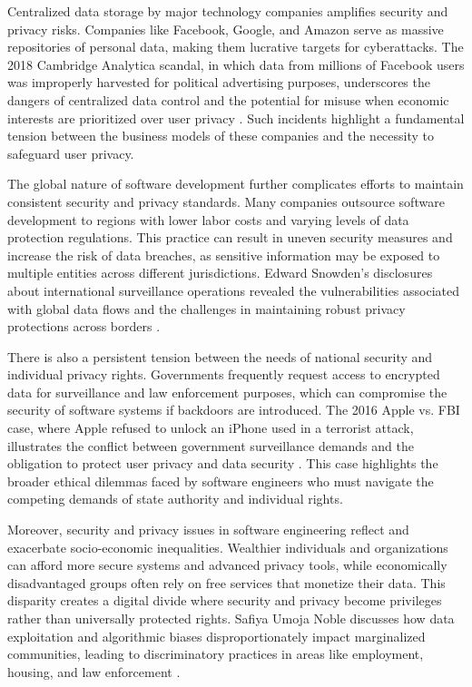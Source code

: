 \begin{refsection}
Centralized data storage by major technology companies amplifies security and privacy risks. Companies like Facebook, Google, and Amazon serve as massive repositories of personal data, making them lucrative targets for cyberattacks. The 2018 Cambridge Analytica scandal, in which data from millions of Facebook users was improperly harvested for political advertising purposes, underscores the dangers of centralized data control and the potential for misuse when economic interests are prioritized over user privacy \cite[pp.~205-209]{vaidhyanathan2019antisocial}. Such incidents highlight a fundamental tension between the business models of these companies and the necessity to safeguard user privacy.

The global nature of software development further complicates efforts to maintain consistent security and privacy standards. Many companies outsource software development to regions with lower labor costs and varying levels of data protection regulations. This practice can result in uneven security measures and increase the risk of data breaches, as sensitive information may be exposed to multiple entities across different jurisdictions. Edward Snowden's disclosures about international surveillance operations revealed the vulnerabilities associated with global data flows and the challenges in maintaining robust privacy protections across borders \cite[pp.~95-99]{snowden2021permanent}.

There is also a persistent tension between the needs of national security and individual privacy rights. Governments frequently request access to encrypted data for surveillance and law enforcement purposes, which can compromise the security of software systems if backdoors are introduced. The 2016 Apple vs. FBI case, where Apple refused to unlock an iPhone used in a terrorist attack, illustrates the conflict between government surveillance demands and the obligation to protect user privacy and data security \cite[pp.~135-138]{bauman1998globalization}. This case highlights the broader ethical dilemmas faced by software engineers who must navigate the competing demands of state authority and individual rights.

Moreover, security and privacy issues in software engineering reflect and exacerbate socio-economic inequalities. Wealthier individuals and organizations can afford more secure systems and advanced privacy tools, while economically disadvantaged groups often rely on free services that monetize their data. This disparity creates a digital divide where security and privacy become privileges rather than universally protected rights. Safiya Umoja Noble discusses how data exploitation and algorithmic biases disproportionately impact marginalized communities, leading to discriminatory practices in areas like employment, housing, and law enforcement \cite[pp.~101-104]{noble2018algorithms}.


\end{refsection}
